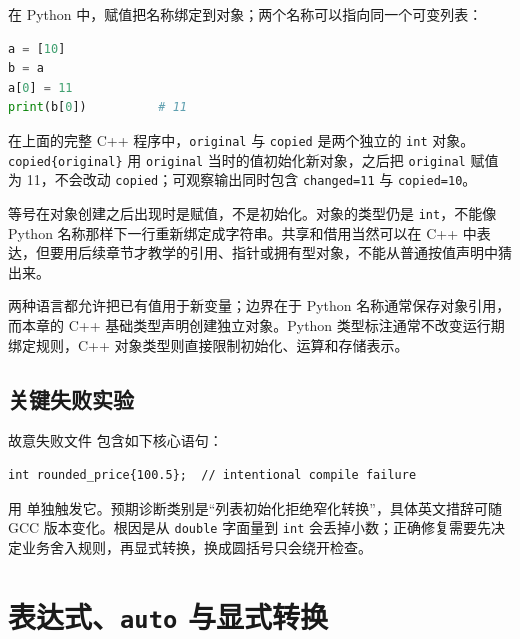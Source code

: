 在 Python 中，赋值把名称绑定到对象；两个名称可以指向同一个可变列表：

\begin{lstlisting}[language=Python]
a = [10]
b = a
a[0] = 11
print(b[0])          # 11
\end{lstlisting}

在上面的完整 C++ 程序中，\texttt{original} 与 \texttt{copied} 是两个独立的 \texttt{int} 对象。\texttt{copied\{original\}} 用 \texttt{original} 当时的值初始化新对象，之后把 \texttt{original} 赋值为 11，不会改动 \texttt{copied}；可观察输出同时包含 \texttt{changed=11} 与 \texttt{copied=10}。

等号在对象创建之后出现时是赋值，不是初始化。对象的类型仍是 \texttt{int}，不能像 Python 名称那样下一行重新绑定成字符串。共享和借用当然可以在 C++ 中表达，但要用后续章节才教学的引用、指针或拥有型对象，不能从普通按值声明中猜出来。

\begin{pythonbridge}
两种语言都允许把已有值用于新变量；边界在于 Python 名称通常保存对象引用，而本章的 C++ 基础类型声明创建独立对象。Python 类型标注通常不改变运行期绑定规则，C++ 对象类型则直接限制初始化、运算和存储表示。

\end{pythonbridge}

\subsection{关键失败实验}

故意失败文件  包含如下核心语句：

\begin{lstlisting}
int rounded_price{100.5};  // intentional compile failure
\end{lstlisting}

用  单独触发它。预期诊断类别是“列表初始化拒绝窄化转换”，具体英文措辞可随 GCC 版本变化。根因是从 \texttt{double} 字面量到 \texttt{int} 会丢掉小数；正确修复需要先决定业务舍入规则，再显式转换，换成圆括号只会绕开检查。

\section{表达式、\texttt{auto} 与显式转换}

